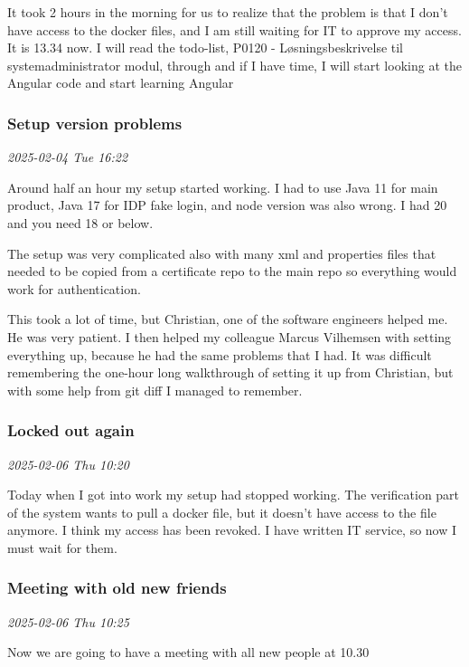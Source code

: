 \documentclass[../main.tex]{subfiles}
\begin{document}
It took 2 hours in the morning for us to realize that the problem is that I don't have access to the docker files, and I am still waiting for IT to approve my access. It is 13.34 now. I will read the todo-list, P0120 - Løsningsbeskrivelse til systemadministrator modul, through and if I have time, I will start looking at the Angular code and start learning Angular

\subsubsection{\textbf{Setup version problems}}

\textit{2025-02-04 Tue 16:22}

Around half an hour my setup started working. I had to use Java 11 for main product, Java 17 for IDP fake login, and node version was also wrong. I had 20 and you need 18 or below.

The setup was very complicated also with many xml and properties files that needed to be copied from a certificate repo to the main repo so everything would work for authentication.

This took a lot of time, but Christian, one of the software engineers helped me. He was very patient. I then helped my colleague Marcus Vilhemsen with setting everything up, because he had the same problems that I had. It was difficult remembering the one-hour long walkthrough of setting it up from Christian, but with some help from git diff I managed to remember.

\subsubsection{\textbf{Locked out again}}

\textit{2025-02-06 Thu 10:20}

Today when I got into work my setup had stopped working. The verification part of the system wants to pull a docker file, but it doesn't have access to the file anymore. I think my access has been revoked. I have written IT service, so now I must wait for them.

\subsubsection{Meeting with old new friends}

\textit{2025-02-06 Thu 10:25}

Now we are going to have a meeting with all new people at 10.30 
\end{document}
